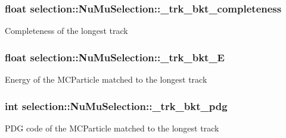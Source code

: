 \subsubsection[{\texorpdfstring{\+\_\+trk\+\_\+bkt\+\_\+completeness}{_trk_bkt_completeness}}]{\setlength{\rightskip}{0pt plus 5cm}float selection\+::\+Nu\+Mu\+Selection\+::\+\_\+trk\+\_\+bkt\+\_\+completeness\hspace{0.3cm}{\ttfamily [private]}}\hypertarget{classselection_1_1NuMuSelection_a569e5b1199f57a2becbd28ee0202baae}{}\label{classselection_1_1NuMuSelection_a569e5b1199f57a2becbd28ee0202baae}
Completeness of the longest track 
\subsubsection[{\texorpdfstring{\+\_\+trk\+\_\+bkt\+\_\+E}{_trk_bkt_E}}]{\setlength{\rightskip}{0pt plus 5cm}float selection\+::\+Nu\+Mu\+Selection\+::\+\_\+trk\+\_\+bkt\+\_\+E\hspace{0.3cm}{\ttfamily [private]}}\hypertarget{classselection_1_1NuMuSelection_a1957763f4a43de544b42a9e04cf83afa}{}\label{classselection_1_1NuMuSelection_a1957763f4a43de544b42a9e04cf83afa}
Energy of the M\+C\+Particle matched to the longest track 
\subsubsection[{\texorpdfstring{\+\_\+trk\+\_\+bkt\+\_\+pdg}{_trk_bkt_pdg}}]{\setlength{\rightskip}{0pt plus 5cm}int selection\+::\+Nu\+Mu\+Selection\+::\+\_\+trk\+\_\+bkt\+\_\+pdg\hspace{0.3cm}{\ttfamily [private]}}\hypertarget{classselection_1_1NuMuSelection_afc6475990e683ff735846740580cac9b}{}\label{classselection_1_1NuMuSelection_afc6475990e683ff735846740580cac9b}
P\+DG code of the M\+C\+Particle matched to the longest track 
